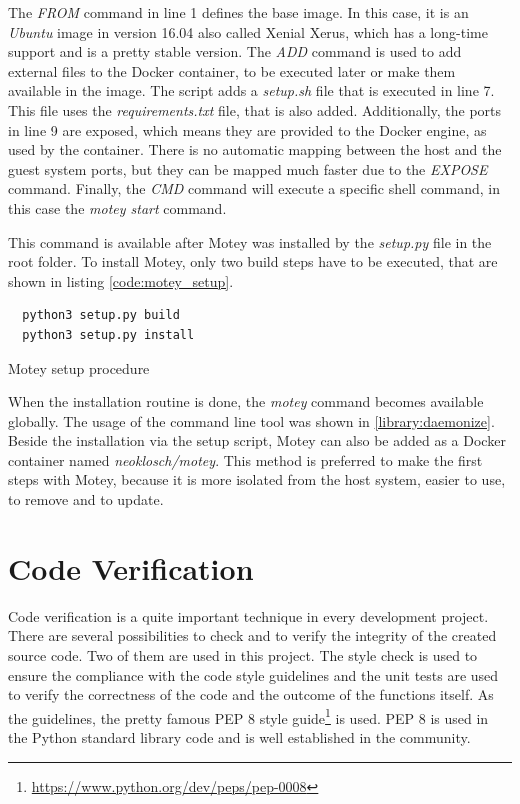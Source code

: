 The \textit{FROM} command in line 1 defines the base image.
In this case, it is an \textit{Ubuntu} image in version 16.04 also called Xenial Xerus, which has a long-time support and is a pretty stable version.
The \textit{ADD} command is used to add external files to the Docker container, to be executed later or make them available in the image.
The script adds a \textit{setup.sh} file that is executed in line 7.
This file uses the \textit{requirements.txt} file, that is also added.
Additionally, the ports in line 9 are exposed, which means they are provided to the Docker engine, as used by the container.
There is no automatic mapping between the host and the guest system ports, but they can be mapped much faster due to the \textit{EXPOSE} command.
Finally, the \textit{CMD} command will execute a specific shell command, in this case the \textit{motey start} command.\newline

This command is available after Motey was installed by the \textit{setup.py} file in the root folder.
To install Motey, only two build steps have to be executed, that are shown in listing \ref{code:motey_setup}.\newline

\begin{listing}[H]
  \begin{verbatim}
  python3 setup.py build
  python3 setup.py install
  \end{verbatim}
  \caption{Motey setup procedure}
  \label{code:motey_setup}
\end{listing}

When the installation routine is done, the \textit{motey} command becomes available globally.
The usage of the command line tool was shown in \ref{library:daemonize}.
Beside the installation via the setup script, Motey can also be added as a Docker container named \textit{neoklosch/motey}.
This method is preferred to make the first steps with Motey, because it is more isolated from the host system, easier to use, to remove and to update.

\section{Code Verification}
\label{section:code-verification}
Code verification is a quite important technique in every development project.
There are several possibilities to check and to verify the integrity of the created source code.
Two of them are used in this project.
The style check is used to ensure the compliance with the code style guidelines and the unit tests are used to verify the correctness of the code and the outcome of the functions itself.
As the guidelines, the pretty famous \ac{PEP} 8 style guide\footnote{\url{https://www.python.org/dev/peps/pep-0008}} is used.
\ac{PEP} 8 is used in the Python standard library code and is well established in the community.\newline

